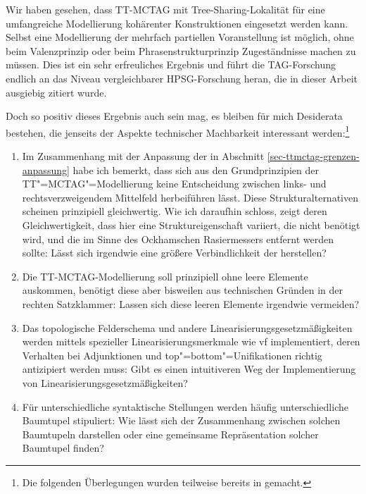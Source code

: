 Wir haben gesehen, dass TT-MCTAG mit Tree-Sharing-Lokalität für eine umfangreiche Modellierung kohärenter Konstruktionen eingesetzt werden kann. Selbst eine Modellierung der mehrfach partiellen Voranstellung ist möglich, ohne beim Valenzprinzip oder beim Phrasenstrukturprinzip Zugeständnisse machen zu müssen. Dies ist ein sehr erfreuliches Ergebnis und führt die TAG-Forschung endlich an das Niveau vergleichbarer HPSG-Forschung heran, die in dieser Arbeit ausgiebig zitiert wurde.

Doch so positiv dieses Ergebnis auch sein mag, es bleiben für mich Desiderata bestehen, die jenseits der Aspekte technischer Machbarkeit interessant werden:\footnote{Die folgenden Überlegungen wurden teilweise bereits in \cite{Lichte:10} gemacht.}
\begin{enumerate}\label{enum-ttmctag-spinal}
  \item Im Zusammenhang mit der Anpassung der  in Abschnitt \ref{sec-ttmctag-grenzen-anpassung} habe ich bemerkt, dass sich aus den Grundprinzipien der TT"=MCTAG"=Modellierung keine Entscheidung zwischen links- und rechtsverzweigendem Mittelfeld herbeiführen lässt. Diese Strukturalternativen scheinen prinzipiell gleichwertig. Wie ich daraufhin schloss, zeigt deren Gleichwertigkeit, dass hier eine Struktureigenschaft variiert, die nicht benötigt wird, und die im Sinne des Ockhamschen Rasiermessers entfernt werden sollte: Lässt sich irgendwie eine grö\ss ere Verbindlichkeit der  herstellen?
  \item Die TT-MCTAG-Modellierung soll prinzipiell ohne leere Elemente auskommen, benötigt diese aber bisweilen aus  technischen Gründen in der rechten Satzklammer: Lassen sich diese leeren Elemente irgendwie vermeiden?
  \item Das topologische Felderschema und andere Linearisierungsgesetzmä\ss igkeiten werden mittels spezieller Linearisierungsmerkmale wie {\sc vf} implementiert, deren Verhalten bei Adjunktionen und {\sc top}"={\sc bottom}"=Unifikationen richtig antizipiert werden muss:  Gibt es einen intuitiveren Weg der Implementierung von Linearisierungsgesetzmä\ss igkeiten?
  \item Für unterschiedliche syntaktische Stellungen werden häufig unterschiedliche Baumtupel stipuliert: Wie lässt sich der Zusammenhang zwischen solchen Baumtupeln darstellen oder eine gemeinsame Repräsentation solcher Baumtupel finden? 
\end{enumerate} 

